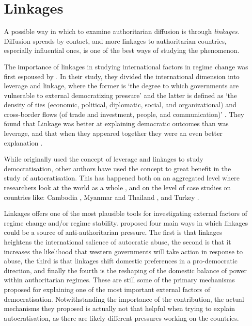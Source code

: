 \section{Linkages}
A possible way in which to examine authoritarian diffusion is through \textit{linkages}. Diffusion spreads by contact, and more linkages to authoritarian countries, especially influential ones, is one of the best ways of studying the phenomenon. 

The importance of linkages in studying international factors in regime change was first espoused by \citet{levitsky_linkage_2006}. In their study, they divided the international dimension into leverage and linkage, where the former is `the degree to which governments are vulnerable to external democratizing pressure' and the latter is defined as `the density of ties (economic, political, diplomatic, social, and organizational) and cross-border flows (of trade and investment, people, and communication)' \citep[p. 379]{levitsky_linkage_2006}. They found that Linkage was better at explaining democratic outcomes than was leverage, and that when they appeared together they were an even better explanation \citep[pp. 388]{levitsky_linkage_2006}.

While \citeauthor{levitsky_linkage_2006} originally used the concept of leverage and linkages to study democratisation, other authors have used the concept to great benefit in the study of autocratisation. This has happened both on an aggregated level where researchers look at the world as a whole \citep{ambrosio_constructing_2010, hall_authoritarian_2017, tansey_ties_2017}, and on the level of case studies on countries like: Cambodia \citep{loughlin_chinese_2021}, Myanmar and Thailand \citep{wong_chinese_2019}, and Turkey \citep{yilmaz_authoritarian_2020}. 

Linkages offers one of the most plausible tools for investigating external factors of regime change and/or regime stability. \citet[pp. 383-386]{levitsky_linkage_2006} proposed four main ways in which linkages could be a source of anti-authoritarian pressure. The first is that linkages heightens the international salience of autocratic abuse, the second is that it increases the likelihood that western governments will take action in response to abuse, the third is that linkages shift domestic preferences in a pro-democratic direction, and finally the fourth is the reshaping of the domestic balance of power within authoritarian regimes. These are still some of the primary mechanisms proposed for explaining one of the most important external factors of democratisation. Notwithstanding the importance of the contribution, the actual mechanisms they proposed is actually not that helpful when trying to explain autocratisation, as there are likely different pressures working on the countries. 

